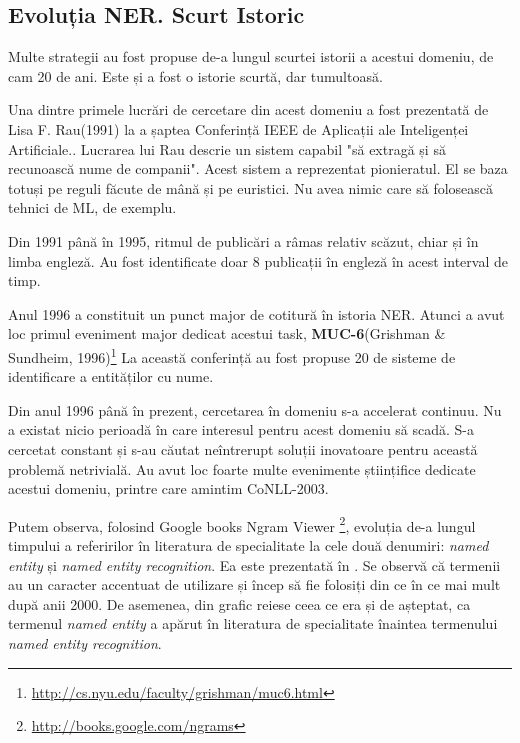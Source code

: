 \subsection{Evoluția NER. Scurt Istoric}

Multe strategii au fost propuse de-a lungul scurtei istorii a acestui domeniu, de cam 20 de ani. Este și a fost o istorie scurtă, dar tumultoasă.

Una dintre primele lucrări de cercetare din acest domeniu a fost prezentată de Lisa F. Rau(1991) la a șaptea Conferință IEEE de Aplicații ale Inteligenței Artificiale.\cite{rau1991}. Lucrarea lui Rau descrie un sistem capabil "să extragă și să recunoască nume de companii". Acest sistem a reprezentat pionieratul. El se baza totuși pe reguli făcute de mână și pe euristici. Nu avea nimic care să folosească tehnici de ML, de exemplu.

Din 1991 până în 1995, ritmul de publicări a râmas relativ scăzut, chiar și în limba engleză. Au fost identificate doar 8 publicații în engleză în acest interval de timp.

Anul 1996 a constituit un punct major de cotitură în istoria NER. Atunci a avut loc primul eveniment major dedicat acestui task, \textbf{MUC-6}(Grishman \& Sundheim, 1996)\footnote{\url{http://cs.nyu.edu/faculty/grishman/muc6.html}}\cite{grishman1996} La această conferință au fost propuse 20 de sisteme de identificare a entităților cu nume.

Din anul 1996 până în prezent, cercetarea în domeniu s-a accelerat continuu. Nu a existat nicio perioadă în care interesul pentru acest domeniu să scadă. S-a cercetat constant și s-au căutat neîntrerupt soluții inovatoare pentru această problemă netrivială. Au avut loc foarte multe evenimente științifice dedicate acestui domeniu, printre care amintim CoNLL-2003.\cite{conll2003}

Putem observa, folosind Google books Ngram Viewer \footnote{\url{http://books.google.com/ngrams}}, evoluția de-a lungul timpului a referirilor în literatura de specialitate la cele două denumiri: \textit{named entity} și \textit{named entity recognition}. Ea este prezentată în . Se observă că termenii au un caracter accentuat de utilizare și încep să fie folosiți din ce în ce mai mult după anii 2000. De asemenea, din grafic reiese ceea ce era și de așteptat, ca termenul \textit{named entity} a apărut în literatura de specialitate înaintea termenului \textit{named entity recognition}.


